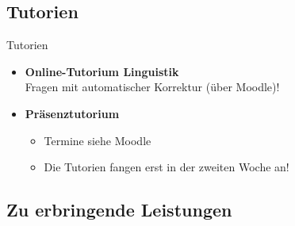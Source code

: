 %
\subsection{Tutorien}

\begin{frame}{Tutorien}

	\begin{itemize}
		\item \textbf{Online-Tutorium Linguistik} \ras\\
                Fragen mit automatischer Korrektur (über Moodle)!\\
		\item \textbf{Präsenztutorium}
		
		\begin{itemize}
			\item Termine siehe Moodle %
			\item Die Tutorien fangen erst in der zweiten Woche an!
		\end{itemize}
		
	\end{itemize}
	
\end{frame}


%
\subsection{Zu erbringende Leistungen}

